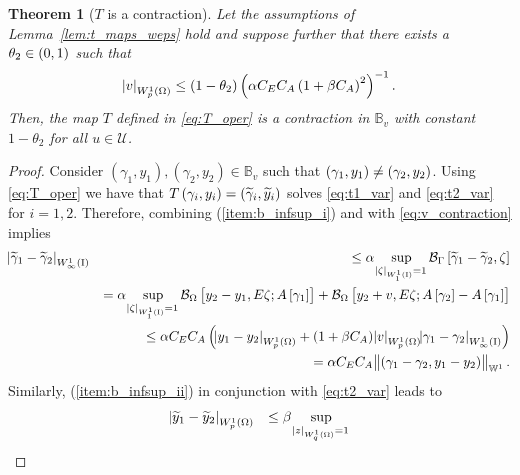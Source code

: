 \documentclass[final]{siamltex}
\newtheorem{thm}[theorem]{Theorem}
\begin{document}
\begin{thm}[$T$ is a contraction]\label{thm:t_contraction} 
Let the assumptions of Lemma~\ref{lem:t_maps_weps} hold and suppose further that there exists a $\theta_2 \in \intoo{0,1}$ such that 
	\begin{align} \label{eq:v_contraction}
		{\abs{{v}}_{{W^{{1}}_{{p}}\del{{\Omega}}}}} \leq (1-\theta_2) \del{\alpha C_E C_A\del{1+\beta C_A}^2}^{-1}.
	\end{align}
Then, the map  $T$ defined in \eqref{eq:T_oper} is a contraction in ${\mathbb{B}}_v$ with constant $1-\theta_2$ for all $u \in {\mathcal{U}}$.
\end{thm}
\begin{proof} 
	Consider $(\gamma_1,y_1), (\gamma_2,y_2) \in {\mathbb{B}}_v$ such that  $\del{\gamma_1,y_1} \neq \del{\gamma_2,y_2}$.
	Using \eqref{eq:T_oper} we have that $T\del{\gamma_i,y_i} = \del{{\widetilde{\gamma}}_i,{\widetilde{y}}_i}$ solves 
	\eqref{eq:t1_var} and \eqref{eq:t2_var} for $i=1,2$. 
	Therefore, combining  (\ref{item:b_infsup_i}) and  with \eqref{eq:v_contraction} implies
	\begin{eqnarray}\label{eq:t_c_gamma}
			{\abs{{{\widetilde{\gamma}}_1 - {\widetilde{\gamma}}_2}}_{{W^{{{1}}}_{{{\infty}}}\del{{\text{\rm I}}}}}} 
				&&\leq \alpha \sup_{{\abs{{\zeta}}_{{W^{{{1}}}_{{{1}}}\del{{\text{\rm I}}}}}}=1} {{\mathcal{B}}_\Gamma}\sbr{{\widetilde{\gamma}}_1 - {\widetilde{\gamma}}_2, \zeta}
					\nonumber \\ 
				&&= \alpha \sup_{{\abs{{\zeta}}_{{W^{{{1}}}_{{{1}}}\del{{\text{\rm I}}}}}}=1} 
					{{\mathcal{B}}_\Omega}\sbr{y_2-y_1,E\zeta;A\sbr{\gamma_1}} + {{\mathcal{B}}_\Omega}\sbr{y_2+v,E\zeta;A\sbr{\gamma_2}-A\sbr{\gamma_1}}
					\nonumber \\ 
				&&\leq \alpha C_EC_A\del{{\abs{{y_1-y_2}}_{{W^{{{1}}}_{{{p}}}\del{{{\Omega}}}}}} 
					+ \del{1+\beta C_A}{\abs{{v}}_{{W^{{1}}_{{p}}\del{{\Omega}}}}}{\abs{{\gamma_1-\gamma_2}}_{{W^{{{1}}}_{{{\infty}}}\del{{\text{\rm I}}}}}}}
					\nonumber \\ 
				&&=\alpha C_EC_A\norm{\del{\gamma_1-\gamma_2,y_1-y_2}}_{{\mathbb{W}}^1}.
	\end{eqnarray}	
         Similarly,  (\ref{item:b_infsup_ii}) in conjunction with \eqref{eq:t2_var} leads to
         \begin{eqnarray}\label{eq:t_c_y}
			{\abs{{{\widetilde{y}}_1 - {\widetilde{y}}_2}}_{{W^{{{1}}}_{{{p}}}\del{{{\Omega}}}}}}
				&&\leq \beta\sup_{{\abs{{z}}_{{W^{{{1}}}_{{{q}}}\del{{{\Omega}}}}}}=1} 

\end{eqnarray}
\end{proof}
\end{document}
